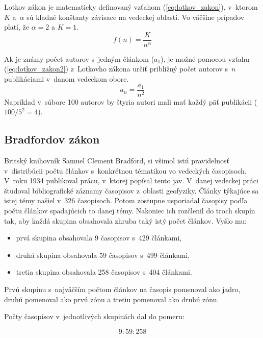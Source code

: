 Lotkov zákon je matematicky definovaný vzťahom (\ref{eq:lotkov_zakon}), v~ktorom
$K$ a~$\alpha$ sú kladné konštanty závisace na vedeckej oblasti.  Vo väčšine
prípadov platí, že $\alpha = 2$ a $K = 1$. \citep{Egghe2005}
\begin{equation}
\label{eq:lotkov_zakon}
f(n) = \frac{K}{n^\alpha}
\end{equation}

Ak je známy počet autorov s~jedným článkom ($a_1$), je možné pomocou vzťahu
(\ref{eq:lotkov_zakon2}) z~Lotkovho zákona určiť približný počet autorov s~$n$
publikáciami v~danom vedeckom obore.
\begin{equation}
\label{eq:lotkov_zakon2}
a_n = \frac{a_1}{n^2}
\end{equation}
Napríklad v~súbore 100 autorov by štyria autori mali mať každý päť publikácii
($100/5^2 = 4$).


\subsection{Bradfordov zákon}

Britský knihovník Samuel Clement Bradford, si všimol istú pravidelnosť
v~distribúcii počtu článkov s~konkrétnou tématikou vo vedeckých časopisoch.
V~roku 1934 publikoval prácu, v~ktorej popísal tento jav.  V~danej vedeckej
práci študoval bibliografické záznamy časopisov z~oblasti geofyziky.  Články
týkajúce sa istej témy našiel v~326 časopisoch.  Potom zostupne usporiadal
časopisy podľa počtu článkov spadajúcich to danej témy.  Nakoniec ich rozčlenil
do troch skupín tak, aby každá skupina obsahovala zhruba taký istý počet
článkov.  Vyšlo mu:

\begin{itemize}
\item prvá skupina obsahovala 9 časopisov s~429 článkami,
\item druhá skupina obsahovala 59 časopisov s~499 článkami,
\item tretia skupina obsahovala 258 časopisov s~404 článkami.
\end{itemize}

Prvú skupinu s~najväčším počtom článkov na časopis pomenoval ako jadro, druhú
pomenoval ako prvú zónu a tretiu pomenoval ako druhú zónu.

Počty časopisov v~jednotlivých skupinách dal do pomeru:

\begin{equation}
\label{eq:bradfordov_zakon1}
9 : 59 : 258
\end{equation}

